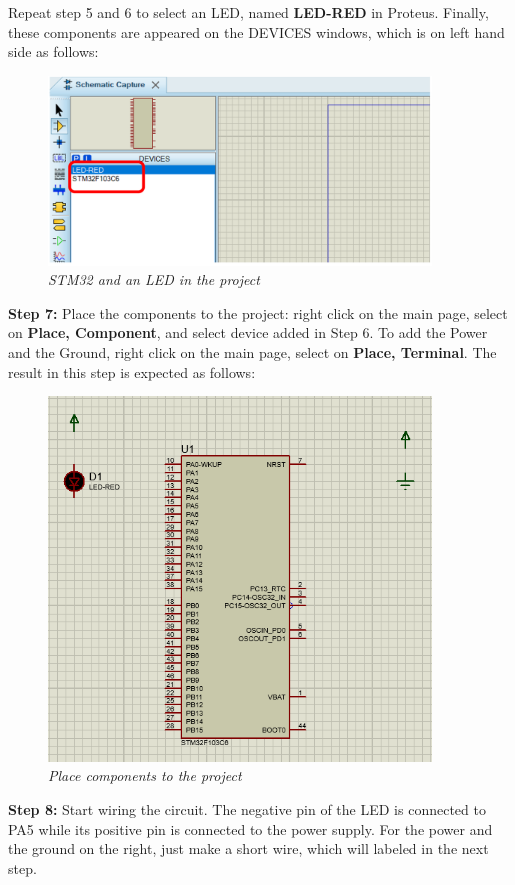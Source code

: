 Repeat step 5 and 6 to select an LED, named \textbf{LED-RED} in Proteus. Finally, these components are appeared on the DEVICES windows, which is on left hand side as follows:
\begin{figure}[!htp]
    \centering
    \includegraphics[width=4in]{source/picture/bai_1/pic11.PNG}
    \caption{\textit{STM32 and an LED in the project}}
    \label{bai1_pic9}
\end{figure}

\textbf{Step 7: } Place the components to the project: right click on the main page, select on \textbf{Place, Component}, and select device added in Step 6. To add the Power and the Ground,  right click on the main page, select on \textbf{Place, Terminal}. The result in this step is expected as follows:
\newpage
\begin{figure}[!htp]
    \centering
    \includegraphics[width=4in]{source/picture/bai_1/pic14.PNG}
    \caption{\textit{Place components to the project}}
    \label{bai1_pic14}
\end{figure}

\textbf{Step 8: } Start wiring the circuit. The negative pin of the LED is connected to PA5 while its positive pin is connected to the power supply. For the power and the ground on the right, just make a short wire, which will labeled in the next step.

